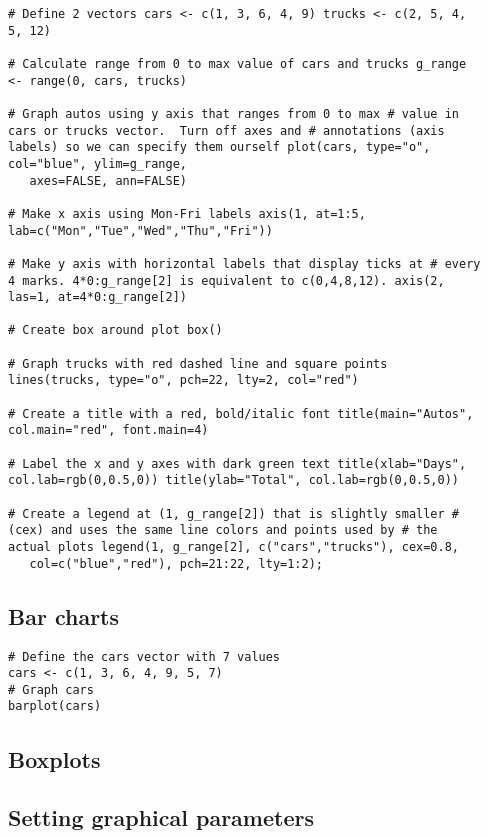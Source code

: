 \begin{myindentpar}{1cm}
\begin{verbatim}
# Define 2 vectors cars <- c(1, 3, 6, 4, 9) trucks <- c(2, 5, 4,
5, 12)

# Calculate range from 0 to max value of cars and trucks g_range
<- range(0, cars, trucks)

# Graph autos using y axis that ranges from 0 to max # value in
cars or trucks vector.  Turn off axes and # annotations (axis
labels) so we can specify them ourself plot(cars, type="o",
col="blue", ylim=g_range,
   axes=FALSE, ann=FALSE)

# Make x axis using Mon-Fri labels axis(1, at=1:5,
lab=c("Mon","Tue","Wed","Thu","Fri"))

# Make y axis with horizontal labels that display ticks at # every
4 marks. 4*0:g_range[2] is equivalent to c(0,4,8,12). axis(2,
las=1, at=4*0:g_range[2])

# Create box around plot box()

# Graph trucks with red dashed line and square points
lines(trucks, type="o", pch=22, lty=2, col="red")

# Create a title with a red, bold/italic font title(main="Autos",
col.main="red", font.main=4)

# Label the x and y axes with dark green text title(xlab="Days",
col.lab=rgb(0,0.5,0)) title(ylab="Total", col.lab=rgb(0,0.5,0))

# Create a legend at (1, g_range[2]) that is slightly smaller #
(cex) and uses the same line colors and points used by # the
actual plots legend(1, g_range[2], c("cars","trucks"), cex=0.8,
   col=c("blue","red"), pch=21:22, lty=1:2);

\end{verbatim}
\end{myindentpar}
\subsection{Bar charts}
\begin{myindentpar}{1cm}
\begin{verbatim}
# Define the cars vector with 7 values
cars <- c(1, 3, 6, 4, 9, 5, 7)
# Graph cars
barplot(cars)
\end{verbatim}
\end{myindentpar}
\subsection{Boxplots}
\subsection{Setting graphical parameters}
